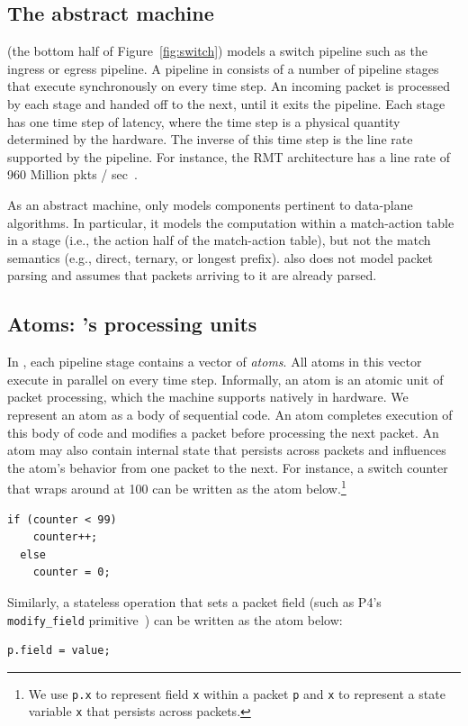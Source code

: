\subsection{The \absmachine abstract machine}

\absmachine (the bottom half of Figure~\ref{fig:switch}) models a switch
pipeline such as the ingress or egress pipeline. A pipeline in \absmachine
consists of a number of pipeline stages that execute synchronously on every
time step. An incoming packet is processed by each stage and handed off to the
next, until it exits the pipeline. Each stage has one time step of latency,
where the time step is a physical quantity determined by the hardware. The
inverse of this time step is the line rate supported by the pipeline. For
instance, the RMT architecture has a line rate of 960 Million pkts /
sec~\cite{rmt}.

As an abstract machine, \absmachine only models components pertinent to
data-plane algorithms. In particular, it models the computation within a
match-action table in a stage (i.e., the action half of the match-action
table), but not the match semantics (e.g., direct, ternary, or longest prefix).
\absmachine also does not model packet parsing and assumes that packets
arriving to it are already parsed.

\subsection{Atoms: \absmachine's processing units}

In \absmachine, each pipeline stage contains a vector of \textit{atoms}. All
atoms in this vector execute in parallel on every time step.  Informally, an
atom is an atomic unit of packet processing, which the \absmachine machine
supports natively in hardware. We represent an atom as a body of sequential
code. An atom completes execution of this body of code and modifies a packet
before processing the next packet.  An atom may also contain internal state
that persists across packets and influences the atom's behavior from one packet
to the next.  For instance, a switch counter that wraps around at 100 can be
written as the atom below.\footnote{We use {\tt p.x} to represent field {\tt x}
  within a packet {\tt p} and {\tt x} to represent a state variable {\tt x}
that persists across packets.}
  \begin{lstlisting}[style=customc, numbers=none, frame=none]
  if (counter < 99)
    counter++;
  else
    counter = 0;
  \end{lstlisting}
Similarly, a stateless operation that sets a packet field (such as P4's {\tt
modify\_field} primitive~\cite{p4spec}) can be written as the atom below:
\begin{lstlisting}[style=customc, numbers=none, frame=none]
  p.field = value;
\end{lstlisting}

